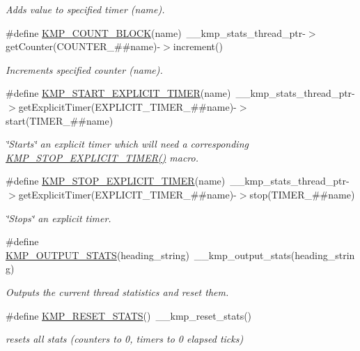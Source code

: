 \begin{DoxyCompactItemize}
\begin{DoxyCompactList}\small\item\em Adds value to specified timer (name). \end{DoxyCompactList}\item 
\#define \hyperlink{group__STATS__GATHERING_ga7fa64ec62947bf0b97f3f4778dd22196}{K\-M\-P\-\_\-\-C\-O\-U\-N\-T\-\_\-\-B\-L\-O\-C\-K}(name)~\-\_\-\-\_\-kmp\-\_\-stats\-\_\-thread\-\_\-ptr-\/$>$get\-Counter(C\-O\-U\-N\-T\-E\-R\-\_\-\#\#name)-\/$>$increment()
\begin{DoxyCompactList}\small\item\em Increments specified counter (name). \end{DoxyCompactList}\item 
\#define \hyperlink{group__STATS__GATHERING_ga8b26485fe6ad4f74b63e54c42fcfd875}{K\-M\-P\-\_\-\-S\-T\-A\-R\-T\-\_\-\-E\-X\-P\-L\-I\-C\-I\-T\-\_\-\-T\-I\-M\-E\-R}(name)~\-\_\-\-\_\-kmp\-\_\-stats\-\_\-thread\-\_\-ptr-\/$>$get\-Explicit\-Timer(E\-X\-P\-L\-I\-C\-I\-T\-\_\-\-T\-I\-M\-E\-R\-\_\-\#\#name)-\/$>$start(T\-I\-M\-E\-R\-\_\-\#\#name)
\begin{DoxyCompactList}\small\item\em \char`\"{}\-Starts\char`\"{} an explicit timer which will need a corresponding \hyperlink{group__STATS__GATHERING_ga6e4f12c6bec4068d72ef9e84516ad01d}{K\-M\-P\-\_\-\-S\-T\-O\-P\-\_\-\-E\-X\-P\-L\-I\-C\-I\-T\-\_\-\-T\-I\-M\-E\-R()} macro. \end{DoxyCompactList}\item 
\#define \hyperlink{group__STATS__GATHERING_ga6e4f12c6bec4068d72ef9e84516ad01d}{K\-M\-P\-\_\-\-S\-T\-O\-P\-\_\-\-E\-X\-P\-L\-I\-C\-I\-T\-\_\-\-T\-I\-M\-E\-R}(name)~\-\_\-\-\_\-kmp\-\_\-stats\-\_\-thread\-\_\-ptr-\/$>$get\-Explicit\-Timer(E\-X\-P\-L\-I\-C\-I\-T\-\_\-\-T\-I\-M\-E\-R\-\_\-\#\#name)-\/$>$stop(T\-I\-M\-E\-R\-\_\-\#\#name)
\begin{DoxyCompactList}\small\item\em \char`\"{}\-Stops\char`\"{} an explicit timer. \end{DoxyCompactList}\item 
\#define \hyperlink{group__STATS__GATHERING_ga568b0fdabf6bf808dcb3b42b97c7bc26}{K\-M\-P\-\_\-\-O\-U\-T\-P\-U\-T\-\_\-\-S\-T\-A\-T\-S}(heading\-\_\-string)~\-\_\-\-\_\-kmp\-\_\-output\-\_\-stats(heading\-\_\-string)
\begin{DoxyCompactList}\small\item\em Outputs the current thread statistics and reset them. \end{DoxyCompactList}\item 
\#define \hyperlink{group__STATS__GATHERING_gaa30e2155ac435335965e2e615c1eaea5}{K\-M\-P\-\_\-\-R\-E\-S\-E\-T\-\_\-\-S\-T\-A\-T\-S}()~\-\_\-\-\_\-kmp\-\_\-reset\-\_\-stats()
\begin{DoxyCompactList}\small\item\em resets all stats (counters to 0, timers to 0 elapsed ticks) \end{DoxyCompactList}\end{DoxyCompactItemize}
